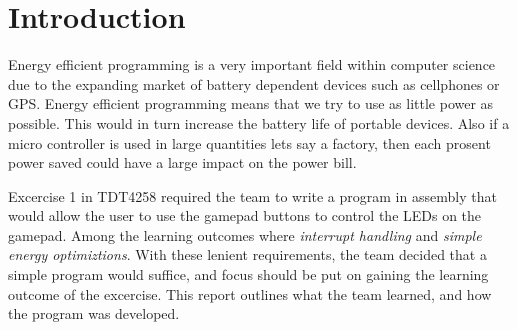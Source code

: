 \section{Introduction}
Energy efficient programming is a very important field within computer science due to the expanding market of battery dependent devices such as cellphones or GPS.
Energy efficient programming means that we try to use as little power as possible.
This would in turn increase the battery life of portable devices.
Also if a micro controller is used in large quantities lets say a factory, then each prosent power saved could have a large impact on the power bill.

Excercise 1 in TDT4258 required the team to write a program in assembly that would allow the user to use the gamepad buttons to control the LEDs on the gamepad.
Among the learning outcomes where \emph{interrupt handling} and \emph{simple energy optimiztions}.
With these lenient requirements, the team decided that a simple program would suffice, and focus should be put on gaining the learning outcome of the excercise.
This report outlines what the team learned, and how the program was developed.
